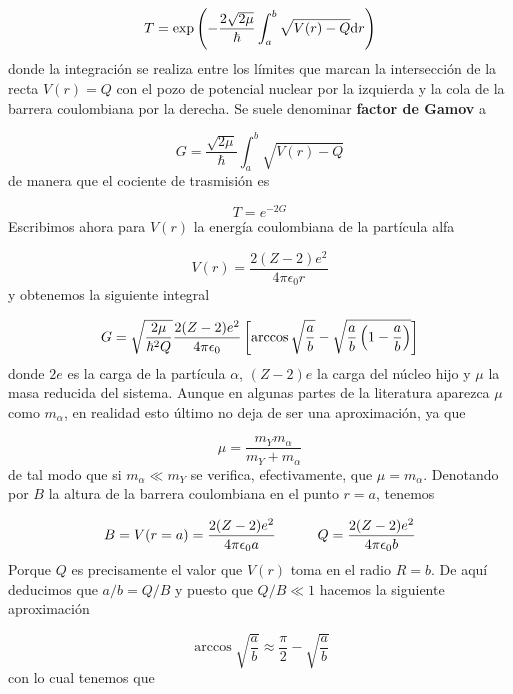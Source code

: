 \begin{equation}
    T = \exp \left( -\frac{2\sqrt{2\mu}}{\hbar } \int_a^b \sqrt{V(r)-Q}\mathrm{d} r \right)
\end{equation}
donde la integración se realiza entre los límites que marcan la intersección de la recta $V(r) = Q$ con el pozo de potencial nuclear por la izquierda y la cola de la barrera coulombiana por la derecha. Se suele denominar \textbf{factor de Gamov} a 

\begin{equation}
    G = \frac{\sqrt{2\mu}}{\hbar} \int_a^b \sqrt{V(r)-Q}
\end{equation}
de manera que el cociente de trasmisión es

\begin{equation}
    T = e^{-2G}
\end{equation}
Escribimos ahora para $V(r)$ la energía coulombiana de la partícula alfa 

\begin{equation}
    V(r) = \frac{2(Z-2)e^2}{4\pi \epsilon_0 r}
\end{equation}
y obtenemos la siguiente integral

\begin{equation}
    G = \sqrt{\frac{2\mu}{\hbar^2Q}} \frac{2(Z-2)e^2}{4 \pi \epsilon_0} \left[ \arccos \sqrt{\frac{a}{b}}- \sqrt{\frac{a}{b}\left( 1-\frac{a}{b} \right)} \right]
\end{equation}
donde $2e$ es la carga de la partícula $\alpha$, $(Z-2)e$ la carga del núcleo hijo y $\mu$ la masa reducida del sistema. Aunque en algunas partes de la literatura aparezca $\mu$ como $m_\alpha$, en realidad esto último no deja de ser una aproximación, ya que 

\begin{equation*}
	\mu = \frac{m_Y m_\alpha}{m_Y + m_\alpha} 
\end{equation*}
de tal modo que si $m_\alpha \ll m_Y$ se verifica, efectivamente, que $\mu=m_\alpha$. Denotando por $B$ la altura de la barrera coulombiana en el punto $r=a$, tenemos 

\begin{equation}
    B= V(r=a) = \frac{2(Z-2)e^2}{4\pi \epsilon_0 a} \quad \quad \quad Q=\frac{2(Z-2)e^2}{4 \pi \epsilon_0 b}
\end{equation}
Porque $Q$ es precisamente el valor que $V(r)$ toma en el radio $R=b$. De aquí deducimos que $a/b=Q/B$ y puesto que $Q/B\ll 1$ hacemos la siguiente aproximación 

\begin{equation}
    \arccos \sqrt{\frac{a}{b}} \approx \frac{\pi}{2} - \sqrt{\frac{a}{b}}
\end{equation}
con lo cual tenemos que 

